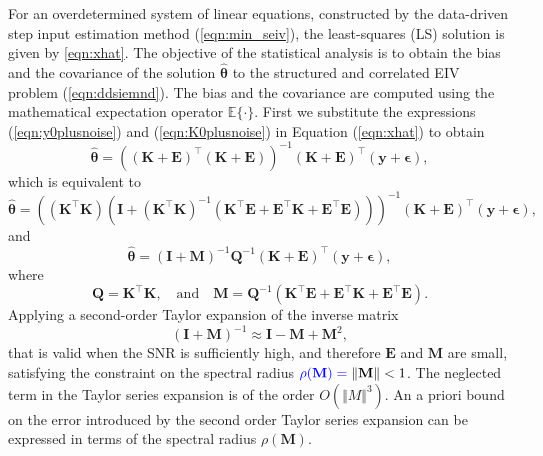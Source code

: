 For an overdetermined system of linear equations, constructed by the data-driven step input estimation method (\ref{eqn:min_seiv}), the least-squares (LS) solution is given by
\ref{eqn:xhat}.
The objective of the statistical analysis is to obtain the bias and the covariance of the solution $\widehat{\bm{\theta}}$ to the structured and correlated EIV problem (\ref{eqn:ddsiemnd}).
The bias and the covariance are computed using the mathematical expectation operator $\mathbb{E}\{\cdot\}$.
First we substitute the expressions (\ref{eqn:y0plusnoise}) and (\ref{eqn:K0plusnoise}) in Equation (\ref{eqn:xhat}) to obtain
\begin{equation*} \widehat{\bm{\theta}} = \left( (\mathbf{K}+\mathbf{E})^\top (\mathbf{K}+\mathbf{E})  \right)^{-1} (\mathbf{K}+\mathbf{E})^\top (\mathbf{y}+\bm{\epsilon}), \end{equation*} 
which is equivalent to \color{blue}
\begin{equation*} \widehat{\bm{\theta}} = \left( \left( \mathbf{K}^\top \mathbf{K} \right)  \left( \mathbf{I} + \left( \mathbf{K}^\top \mathbf{K} \right)^{-1} \left( \mathbf{K}^\top \mathbf{E} + \mathbf{E}^\top \mathbf{K} + \mathbf{E}^\top \mathbf{E} \right) \right)  \right)^{-1} (\mathbf{K}+\mathbf{E})^\top (\mathbf{y}+\bm{\epsilon}), \end{equation*} 
and \color{black}
\begin{equation} \widehat{\bm{\theta}} = \left( \mathbf{I} + \mathbf{M} \right)^{-1} \mathbf{Q}^{-1} (\mathbf{K}+\mathbf{E})^\top (\mathbf{y}+\bm{\epsilon}), \label{eqn:1steq} \end{equation} 
where 
\begin{equation} \mathbf{Q} = \mathbf{K}^\top \mathbf{K}, \quad \text{and} \quad \mathbf{M} = \mathbf{Q}^{-1} ( \mathbf{K}^\top \mathbf{E} + \mathbf{E}^\top \mathbf{K} + \mathbf{E}^\top \mathbf{E} ). \end{equation} 
Applying a second-order Taylor expansion of the inverse matrix
\begin{equation} (\mathbf{I} + \mathbf{M})^{-1} \approx \mathbf{I} - \mathbf{M} + \mathbf{M}^2, \label{eqn:TseriesExp} \end{equation} 
that is valid when the SNR is sufficiently high, and therefore $\mathbf{E}$ and $\mathbf{M}$ are small, satisfying the constraint on the spectral radius $\color{blue} \rho(\mathbf{M}) = \color{black} \| \mathbf{M} \| < 1$. 
The neglected term in the Taylor series expansion is of the order $O(\Vert M \Vert^3)$.
\color{blue} An a priori bound on the error introduced by the second order Taylor series expansion can be expressed in terms of the spectral radius $\rho(\mathbf{M})$.
